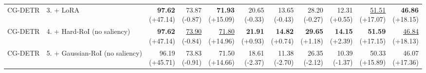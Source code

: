 \documentclass{article}
\begin{document}
{\begin{tabular}{llrrrrrrrrr}
CG-DETR & 3. + LoRA & \shortstack{\textbf{97.62} \\ {\scriptsize (+47.14)}} & \shortstack{73.87 \\ {\scriptsize (-0.87)}} & \shortstack{\textbf{71.93} \\ {\scriptsize (+15.09)}} & \shortstack{20.65 \\ {\scriptsize (-0.33)}} & \shortstack{13.65 \\ {\scriptsize (-0.43)}} & \shortstack{28.20 \\ {\scriptsize (-0.27)}} & \shortstack{12.31 \\ {\scriptsize (+0.55)}} & \shortstack{\underline{51.51} \\ {\scriptsize (+17.07)}} & \shortstack{\textbf{46.86} \\ {\scriptsize (+18.15)}} \\
CG-DETR & 4. + Hard-RoI (no saliency) & \shortstack{\textbf{97.62} \\ {\scriptsize (+47.14)}} & \shortstack{\underline{73.90} \\ {\scriptsize (-0.84)}} & \shortstack{\underline{71.80} \\ {\scriptsize (+14.96)}} & \shortstack{\textbf{21.91} \\ {\scriptsize (+0.93)}} & \shortstack{\textbf{14.82} \\ {\scriptsize (+0.74)}} & \shortstack{\textbf{29.65} \\ {\scriptsize (+1.18)}} & \shortstack{\textbf{14.15} \\ {\scriptsize (+2.39)}} & \shortstack{\textbf{51.59} \\ {\scriptsize (+17.15)}} & \shortstack{\underline{46.84} \\ {\scriptsize (+18.13)}} \\
CG-DETR & 5. + Gaussian-RoI (no saliency) & \shortstack{96.19 \\ {\scriptsize (+45.71)}} & \shortstack{73.83 \\ {\scriptsize (-0.91)}} & \shortstack{71.50 \\ {\scriptsize (+14.66)}} & \shortstack{18.61 \\ {\scriptsize (-2.37)}} & \shortstack{11.38 \\ {\scriptsize (-2.70)}} & \shortstack{26.35 \\ {\scriptsize (-2.12)}} & \shortstack{10.39 \\ {\scriptsize (-1.37)}} & \shortstack{50.33 \\ {\scriptsize (+15.89)}} & \shortstack{46.07 \\ {\scriptsize (+17.36)}} \\

\end{tabular}}
\end{document}
